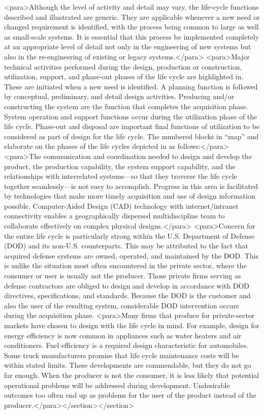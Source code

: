 <para>Although the level of activity and detail may vary, the life-cycle functions described and illustrated are generic. They are applicable whenever a new need or changed requirement is identified, with the process being common to large as well as small-scale systems. It is essential that this process be implemented completely at an appropriate level of detail not only in the engineering of new systems but also in the re-engineering of existing or legacy systems.</para>
<para>Major technical activities performed during the design, production or construction, utilization, support, and phase-out phases of the life cycle are highlighted in. These are initiated when a new need is identified. A planning function is followed by conceptual, preliminary, and detail design activities. Producing and/or constructing the system are the function that completes the acquisition phase. System operation and support functions occur during the utilization phase of the life cycle. Phase-out and disposal are important final functions of utilization to be considered as part of design for the life cycle.
The numbered blocks in “map” and elaborate on the phases of the life cycles depicted in as follows:</para>
<para>The communication and coordination needed to design and develop the product, the production capability, the system support capability, and the relationships with interrelated systems—so that they traverse the life cycle together seamlessly—is not easy to accomplish. Progress in this area is facilitated by technologies that make more timely acquisition and use of design information possible. Computer-Aided Design (CAD) technology with internet/intranet connectivity enables a geographically dispersed multidiscipline team to collaborate effectively on complex physical designs.</para>
<para>Concern for the entire life cycle is particularly strong within the U.S. Department of Defense (DOD) and its non-U.S. counterparts. This may be attributed to the fact that acquired defense systems are owned, operated, and maintained by the DOD. This is unlike the situation most often encountered in the private sector, where the consumer or user is usually not the producer. Those private firms serving as defense contractors are obliged to design and develop in accordance with DOD directives, specifications, and standards. Because the DOD is the customer and also the user of the resulting system, considerable DOD intervention occurs during the acquisition phase.
<para>Many firms that produce for private-sector markets have chosen to design with the life cycle in mind. For example, design for energy efficiency is now common in appliances such as water heaters and air conditioners. Fuel efficiency is a required design characteristic for automobiles. Some truck manufacturers promise that life cycle maintenance costs will be within stated limits. These developments are commendable, but they do not go far enough. When the producer is not the consumer, it is less likely that potential operational problems will be addressed during development. Undesirable outcomes too often end up as problems for the user of the product instead of the producer.</para></section></section>
